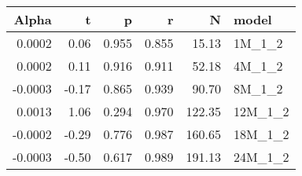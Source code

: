 \begin{table}[ht]
\centering
\begin{tabular}{rrrrrl}
  \hline
Alpha & t & p & r & N & model \\ 
  \hline
0.0002 & 0.06 & 0.955 & 0.855 & 15.13 & 1M\_1\_2 \\ 
  0.0002 & 0.11 & 0.916 & 0.911 & 52.18 & 4M\_1\_2 \\ 
  -0.0003 & -0.17 & 0.865 & 0.939 & 90.70 & 8M\_1\_2 \\ 
  0.0013 & 1.06 & 0.294 & 0.970 & 122.35 & 12M\_1\_2 \\ 
  -0.0002 & -0.29 & 0.776 & 0.987 & 160.65 & 18M\_1\_2 \\ 
  -0.0003 & -0.50 & 0.617 & 0.989 & 191.13 & 24M\_1\_2 \\ 
   \hline
\end{tabular}
\end{table}

